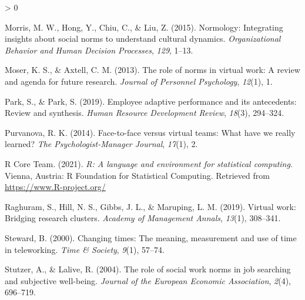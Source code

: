 \documentclass[
  english,
  man]{apa6}
\newlength{\cslhangindent}
\newenvironment{CSLReferences}[2] %
 {%
  \setlength{\parindent}{0pt}
  \ifodd #1 \everypar{\setlength{\hangindent}{\cslhangindent}}\ignorespaces\fi
  \ifnum #2 > 0
  \setlength{\parskip}{#2\baselineskip}
  \fi
 }%
 {}
\begin{document}
\begin{CSLReferences}{1}{0}
\leavevmode\hypertarget{ref-morris_normology_2015}{}%
Morris, M. W., Hong, Y., Chiu, C., \& Liu, Z. (2015). Normology: Integrating insights about social norms to understand cultural dynamics. \emph{Organizational Behavior and Human Decision Processes}, \emph{129}, 1--13.

\leavevmode\hypertarget{ref-moser_role_2013}{}%
Moser, K. S., \& Axtell, C. M. (2013). The role of norms in virtual work: A review and agenda for future research. \emph{Journal of Personnel Psychology}, \emph{12}(1), 1.

\leavevmode\hypertarget{ref-park_employee_2019}{}%
Park, S., \& Park, S. (2019). Employee adaptive performance and its antecedents: Review and synthesis. \emph{Human Resource Development Review}, \emph{18}(3), 294--324.

\leavevmode\hypertarget{ref-purvanova_face--face_2014}{}%
Purvanova, R. K. (2014). Face-to-face versus virtual teams: What have we really learned? \emph{The Psychologist-Manager Journal}, \emph{17}(1), 2.

\leavevmode\hypertarget{ref-R-base}{}%
R Core Team. (2021). \emph{R: A language and environment for statistical computing}. Vienna, Austria: R Foundation for Statistical Computing. Retrieved from \url{https://www.R-project.org/}

\leavevmode\hypertarget{ref-raghuram_virtual_2019}{}%
Raghuram, S., Hill, N. S., Gibbs, J. L., \& Maruping, L. M. (2019). Virtual work: Bridging research clusters. \emph{Academy of Management Annals}, \emph{13}(1), 308--341.

\leavevmode\hypertarget{ref-steward_changing_2000}{}%
Steward, B. (2000). Changing times: The meaning, measurement and use of time in teleworking. \emph{Time \& Society}, \emph{9}(1), 57--74.

\leavevmode\hypertarget{ref-stutzer_role_2004}{}%
Stutzer, A., \& Lalive, R. (2004). The role of social work norms in job searching and subjective well-being. \emph{Journal of the European Economic Association}, \emph{2}(4), 696--719.

\end{CSLReferences}

\endgroup
\end{document}

